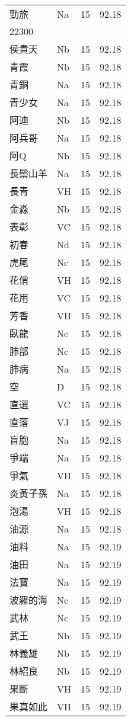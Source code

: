 \documentclass[twocolumn]{book}
\begin{document}
\begin{supertabular}{llrr}
勁旅 & Na & 15 &  92.18\\
22300\\
侯貴天 & Nb & 15 &  92.18\\
青霞 & Nb & 15 &  92.18\\
青銅 & Na & 15 &  92.18\\
青少女 & Na & 15 &  92.18\\
阿迪 & Nb & 15 &  92.18\\
阿兵哥 & Na & 15 &  92.18\\
阿Q & Nb & 15 &  92.18\\
長鬃山羊 & Na & 15 &  92.18\\
長青 & VH & 15 &  92.18\\
金淼 & Nb & 15 &  92.18\\
表彰 & VC & 15 &  92.18\\
初春 & Nd & 15 &  92.18\\
虎尾 & Nc & 15 &  92.18\\
花俏 & VH & 15 &  92.18\\
花用 & VC & 15 &  92.18\\
芳香 & VH & 15 &  92.18\\
臥龍 & Nc & 15 &  92.18\\
肺部 & Nc & 15 &  92.18\\
肺病 & Na & 15 &  92.18\\
空 & D & 15 &  92.18\\
直選 & VC & 15 &  92.18\\
直落 & VJ & 15 &  92.18\\
盲胞 & Na & 15 &  92.18\\
爭端 & Na & 15 &  92.18\\
爭氣 & VH & 15 &  92.18\\
炎黃子孫 & Na & 15 &  92.18\\
泡湯 & VH & 15 &  92.18\\
油源 & Na & 15 &  92.18\\
油料 & Na & 15 &  92.19\\
油田 & Na & 15 &  92.19\\
法寶 & Na & 15 &  92.19\\
波羅的海 & Nc & 15 &  92.19\\
武林 & Nc & 15 &  92.19\\
武王 & Nb & 15 &  92.19\\
林義雄 & Nb & 15 &  92.19\\
林紹良 & Nb & 15 &  92.19\\
果斷 & VH & 15 &  92.19\\
果真如此 & VH & 15 &  92.19\\

\end{supertabular}
\end{document}

